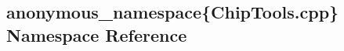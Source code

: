 \hypertarget{namespaceanonymous__namespace_02ChipTools_8cpp_03}{\subsection{anonymous\-\_\-namespace\{Chip\-Tools.\-cpp\} Namespace Reference}
\label{namespaceanonymous__namespace_02ChipTools_8cpp_03}
}
